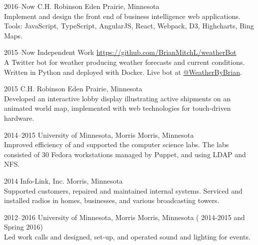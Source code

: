 \documentclass[]{cv-style} %
\begin{document}
\begin{entrylist}

\entry
{2016--Now}
{C.H. Robinson}
{Eden Prairie, Minnesota}
{ \\
Implement and design the front end of business intelligence web applications. Tools: JavaScript, TypeScript, AngularJS, React, Webpack, D3, Highcharts, Bing Maps.}


\entry
{2015--Now}
{Independent Work}
{\href{https://github.com/BrianMitchL/weatherBot}{https://github.com/BrianMitchL/weatherBot}}
{ \\
A Twitter bot for weather producing weather forecasts and current conditions. Written in Python and deployed with Docker. Live bot at \href{https://twitter.com/WeatherByBrian}{@WeatherByBrian}.}


\entry
{2015}
{C.H. Robinson}
{Eden Prairie, Minnesota}
{ \\
Developed an interactive lobby display illustrating active shipments on an animated world map, implemented with web technologies for touch-driven hardware.}


\entry
{2014--2015}
{University of Minnesota, Morris}
{Morris, Minnesota}
{ \\
Improved efficiency of and supported the computer science labs. The labs consisted of 30 Fedora workstations managed by Puppet, and using LDAP and NFS.}


\entry
{2014}
{Info-Link, Inc.}
{Morris, Minnesota}
{ \\
Supported customers, repaired and maintained internal systems. Serviced and installed radios in homes, businesses, and various broadcasting towers.}


\entry
{2012--2016}
{University of Minnesota, Morris}
{Morris, Minnesota}
{ ( 2014-2015 and Spring 2016) \\
Led work calls and designed, set-­up, and operated sound and lighting for events.}


\end{entrylist}
\end{document}
